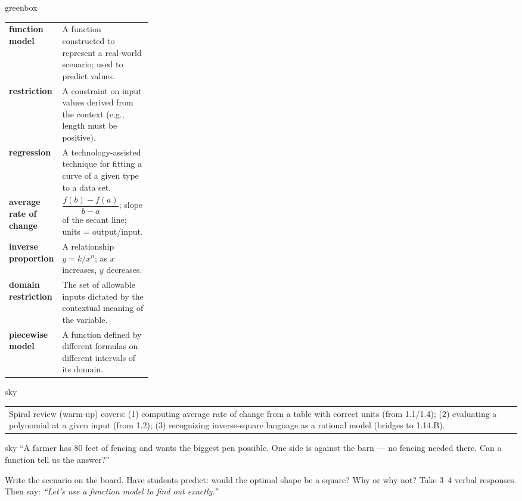 \documentclass[10pt]{article}
\begin{document}
\begin{skillbox}{greenbox}
\renewcommand{\arraystretch}{1.4}
\begin{tabularx}{\linewidth}{@{} >{\bfseries\color{navy}}p{0.28\linewidth} X @{}}
function model        & A function constructed to represent a real-world scenario; used to predict values. \\
restriction           & A constraint on input values derived from the context (e.g., length must be positive). \\
regression            & A technology-assisted technique for fitting a curve of a given type to a data set. \\
average rate of change & $\dfrac{f(b)-f(a)}{b-a}$; slope of the secant line; units = output/input. \\
inverse proportion    & A relationship $y = k/x^n$; as $x$ increases, $y$ decreases. \\
domain restriction    & The set of allowable inputs dictated by the contextual meaning of the variable. \\
piecewise model       & A function defined by different formulas on different intervals of its domain. \\
\end{tabularx}
\end{skillbox}

\begin{skillbox}{sky}
    \begin{tabularx}{\linewidth}{@{}X@{}}
        Spiral review (warm-up) covers: (1) computing average rate of change from a table with
        correct units (from 1.1/1.4); (2) evaluating a polynomial at a given input (from 1.2);
        (3) recognizing inverse-square language as a rational model (bridges to 1.14.B).
    \end{tabularx}
\end{skillbox}

\begin{skillbox}[Hook]{sky}
``A farmer has 80 feet of fencing and wants the biggest pen possible. One side is against the barn
--- no fencing needed there. Can a function tell us the answer?''

Write the scenario on the board. Have students predict: would the optimal shape be a square?
Why or why not? Take 3--4 verbal responses. Then say: \textit{``Let's use a function model to
find out exactly.''}
\end{skillbox}
\end{document}

